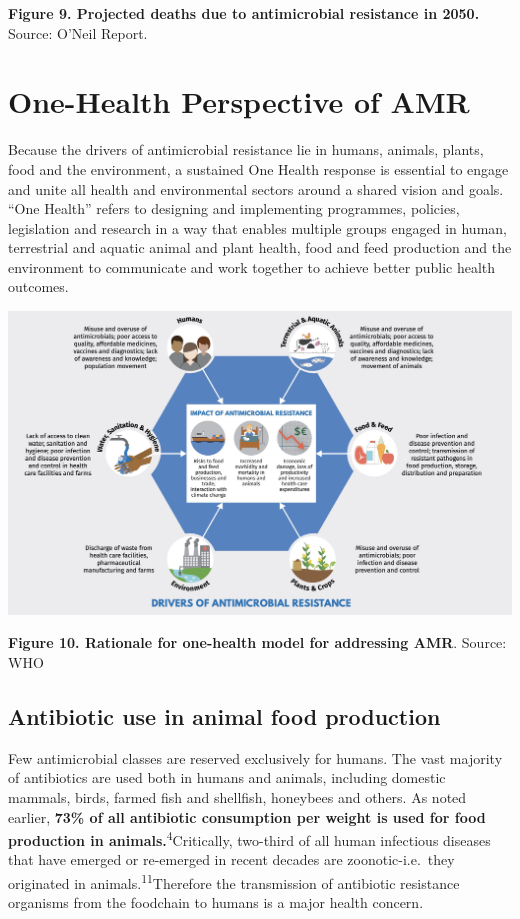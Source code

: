 \documentclass[
]{book}
\begin{document}
\textbf{Figure 9. Projected deaths due to antimicrobial resistance in 2050.} Source: O'Neil Report.

\hypertarget{one-health-perspective-of-amr}{%
\section*{One-Health Perspective of AMR}\label{one-health-perspective-of-amr}}

Because the drivers of antimicrobial resistance lie in humans, animals, plants, food and the environment, a sustained One Health response is essential to engage and unite all health and environmental sectors around a shared vision and goals. ``One Health'' refers to designing and implementing programmes, policies, legislation and research in a way that enables multiple groups engaged in human, terrestrial and aquatic animal and plant health, food and feed production and the environment to communicate and work together to achieve better public health outcomes.

\includegraphics[width=8.33333in,height=\textheight]{images/onehealth.jpg}

\textbf{Figure 10. Rationale for one-health model for addressing AMR}. Source: WHO

\hypertarget{antibiotic-use-in-animal-food-production}{%
\subsection*{Antibiotic use in animal food production}\label{antibiotic-use-in-animal-food-production}}

Few antimicrobial classes are reserved exclusively for humans. The vast majority of antibiotics are used both in humans and animals, including domestic mammals, birds, farmed fish and shellfish, honeybees and others. As noted earlier, \textbf{73\% of all antibiotic consumption per weight is used for food production in animals.}\textsuperscript{4}Critically, two-third of all human infectious diseases that have emerged or re-emerged in recent decades are zoonotic-i.e.~they originated in animals.\textsuperscript{11}Therefore the transmission of antibiotic resistance organisms from the foodchain to humans is a major health concern.
\end{document}
